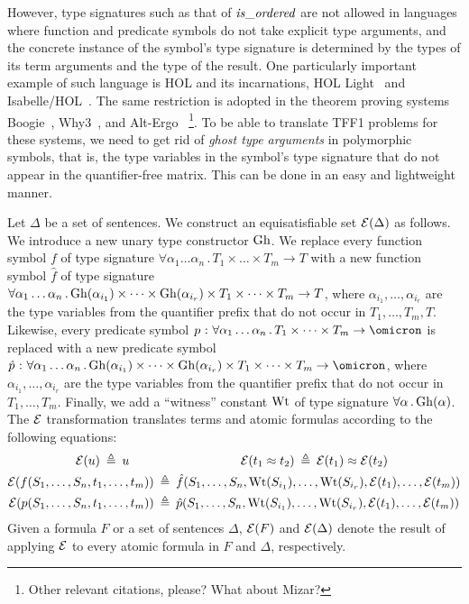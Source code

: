 However, type signatures such as that of $\mathit{is\_ordered}$ are not
allowed in languages where function and predicate symbols do not take
explicit type arguments, and the concrete instance of the symbol's type
signature is determined by the types of its term arguments and the type
of the result.
One particularly important example of such language is HOL
and its incarnations, HOL Light~\cite{harrison09hollight}
and Isabelle/HOL~\cite{NipkowPaulsonWenzel2002Isabelle}.
The same restriction is adopted in the theorem proving systems
Boogie~\cite{Barnett06boogie}, Why3~\cite{boogie11why3}, and
Alt-Ergo~\cite{conchon08smt}%
\footnote{Other relevant citations, please? What about Mizar?}.
To be able to translate TFF1 problems for these systems, we need
to get rid of {\em ghost type arguments} in polymorphic symbols,
that is, the type variables in the symbol's type signature that
do not appear in the quantifier-free matrix.
This can be done in an easy and lightweight manner.

Let $\Delta$ be a set of sentences.
We construct an equisatisfiable set $\mathcal{E}(\Delta)$ as follows.
%
We introduce a new unary type constructor $\mathrm{Gh}$.
We replace every function symbol $f$ of type signature
$\forall \alpha_1\dots\alpha_n \,.\, T_1 \times \dots \times T_m \to T$
with a new function symbol $\hat{f}$ of type signature
$\forall \alpha_1\dots\alpha_n \,.\,
\mathrm{Gh}(\alpha_{i_1}) \times \dots \times \mathrm{Gh}(\alpha_{i_r}) \times
T_1 \times \dots \times T_m \to T$,
where $\alpha_{i_1},\dots,\alpha_{i_r}$ are the type
variables from the quantifier prefix that do not occur in
$T_1,\dots,T_m,T$.
Likewise, every predicate symbol $p \,\ty\,
\forall \alpha_1\dots\alpha_n \,.\, T_1 \times \dots \times T_m \to \omicron$
is replaced with a new predicate symbol $\hat{p} \,\ty\,
\forall \alpha_1\dots\alpha_n \,.\,
\ghost(\alpha_{i_1}) \times \dots \times \ghost(\alpha_{i_r}) \times
T_1 \times \dots \times T_m \to \omicron$,
where $\alpha_{i_1},\dots,\alpha_{i_r}$ are the type
variables from the quantifier prefix that do not occur in
$T_1,\dots,T_m$.
Finally, we add a ``witness'' constant $\mathrm{Wt}$
of type signature $\forall \alpha\,.\,\mathrm{Gh}(\alpha)$.
The $\mathcal{E}$ transformation translates terms and atomic
formulas according to the following equations:
\begin{align*}
\mathcal{E}(u) \:\triangleq\: u
\quad\quad & \qquad\qquad\qquad\quad
\mathcal{E}(t_1 \approx t_2) \:\triangleq\: \mathcal{E}(t_1) \approx \mathcal{E}(t_2) \\
\mathcal{E}(f(S_1,\dots,S_n,t_1,\dots,t_m)) &\:\triangleq\:
\hat{f}(S_1,\dots,S_n,\mathrm{Wt}(S_{i_1}),\dots,\mathrm{Wt}(S_{i_r}),
\mathcal{E}(t_1),\dots,\mathcal{E}(t_m)) \\
\mathcal{E}(p(S_1,\dots,S_n,t_1,\dots,t_m)) &\:\triangleq\:
\hat{p}(S_1,\dots,S_n,\mathrm{Wt}(S_{i_1}),\dots,\mathrm{Wt}(S_{i_r}),
\mathcal{E}(t_1),\dots,\mathcal{E}(t_m))
\end{align*}
Given a formula $F$ or a set of sentences $\Delta$,
$\mathcal{E}(F)$ and $\mathcal{E}(\Delta)$ denote the result of
applying $\mathcal{E}$ to every atomic formula in $F$ and
$\Delta$, respectively.

